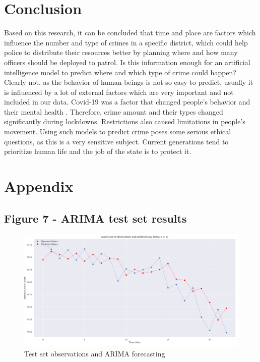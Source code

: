 \documentclass[a4paper, twocolumn]{article}
\begin{document}
\section{Conclusion}
Based on this research, it can be concluded that time and place are factors which influence the number and type of crimes in a specific district, 
which could help police to distribute their resources better by planning where and how many officers should be deployed to patrol. 
Is this information enough for an artificial intelligence model to predict where and which type of crime could happen? 
Clearly not, as the behavior of human beings is not so easy to predict, usually it is influenced by a lot of external factors which are very important and not included in our data. 
Covid-19 was a factor that changed people's behavior and their mental health \cite{kim2021exploring}. Therefore, crime amount and their types changed significantly during lockdowns. 
Restrictions also caused limitations in people's movement. Using such models to predict crime poses some serious ethical questions,
as this is a very sensitive subject. Current generations tend to prioritize human life and the job of the state is to protect it.

\onecolumn
\printbibliography[heading=bibintoc,title={Bibliography}]
\newpage

\appendix

\section{Appendix}


\subsection{Figure 7 - ARIMA test set results}\label{appendix:fig5}
\begin{figure}[h]
\includegraphics[width=\textwidth]{fig6.png}
\caption{Test set observations and ARIMA forecasting}
\end{figure}
\newpage
\end{document}
